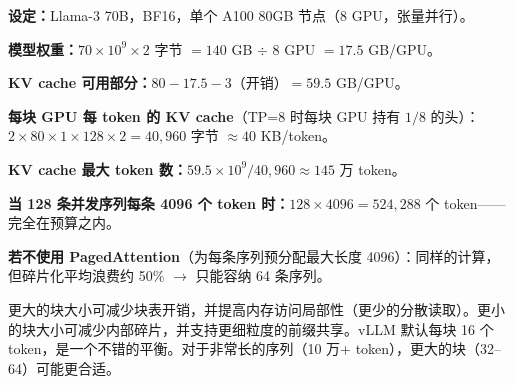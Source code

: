 \begin{examplebox}[显存预算——70B BF16 推理]
\textbf{设定：}Llama-3 70B，BF16，单个 A100 80GB 节点（8 GPU，张量并行）。

\textbf{模型权重：}$70 \times 10^9 \times 2$ 字节 $= 140$ GB $\div$ 8 GPU $= 17.5$ GB/GPU。

\textbf{KV cache 可用部分：}$80 - 17.5 - 3$（开销）$= 59.5$ GB/GPU。

\textbf{每块 GPU 每 token 的 KV cache}（TP=8 时每块 GPU 持有 $1/8$ 的头）：$2 \times 80 \times 1 \times 128 \times 2 = 40{,}960$ 字节 $\approx 40$ KB/token。

\textbf{KV cache 最大 token 数：}$59.5 \times 10^9 / 40{,}960 \approx 145$ 万 token。

\textbf{当 128 条并发序列每条 4096 个 token 时：}$128 \times 4096 = 524{,}288$ 个 token——完全在预算之内。

\textbf{若不使用 PagedAttention}（为每条序列预分配最大长度 4096）：同样的计算，但碎片化平均浪费约 50\% $\to$ 只能容纳 64 条序列。
\end{examplebox}

\begin{warningbox}[块大小的权衡]
更大的块大小可减少块表开销，并提高内存访问局部性（更少的分散读取）。更小的块大小可减少内部碎片，并支持更细粒度的前缀共享。vLLM 默认每块 16 个 token，是一个不错的平衡。对于非常长的序列（10 万+ token），更大的块（32--64）可能更合适。
\end{warningbox}

